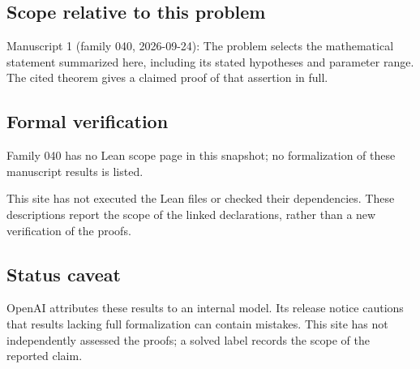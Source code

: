 \documentclass[11pt]{article}
\begin{document}
\subsection{Scope relative to this problem}
Manuscript 1 (family 040, 2026-09-24): The problem selects the mathematical statement summarized here, including its stated hypotheses and parameter range. The cited theorem gives a claimed proof of that assertion in full.

\subsection{Formal verification}
Family 040 has no Lean scope page in this snapshot; no formalization of these manuscript results is listed.

This site has not executed the Lean files or checked their dependencies. These descriptions report the scope of the linked declarations, rather than a new verification of the proofs.

\subsection{Status caveat}
OpenAI attributes these results to an internal model. Its release notice cautions that results lacking full formalization can contain mistakes. This site has not independently assessed the proofs; a solved label records the scope of the reported claim.
\end{document}
